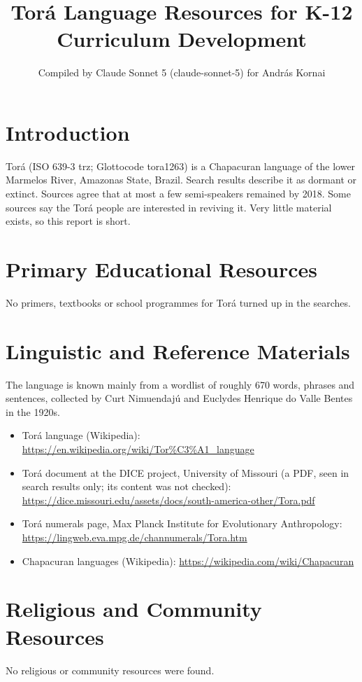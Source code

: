 \documentclass[12pt]{article}
\title{Tor\'a Language Resources for K-12 Curriculum Development}
\author{Compiled by Claude Sonnet 5 (claude-sonnet-5) for Andr\'as Kornai}
\date{}
\begin{document}
\maketitle

\section{Introduction}
Tor\'a (ISO 639-3 trz; Glottocode tora1263) is a Chapacuran language of the lower Marmelos River, Amazonas State, Brazil. Search results describe it as dormant or extinct. Sources agree that at most a few semi-speakers remained by 2018. Some sources say the Tor\'a people are interested in reviving it. Very little material exists, so this report is short.

\section{Primary Educational Resources}
No primers, textbooks or school programmes for Tor\'a turned up in the searches.

\section{Linguistic and Reference Materials}
The language is known mainly from a wordlist of roughly 670 words, phrases and sentences, collected by Curt Nimuend\-aj\'u and Euclydes Henrique do Valle Bentes in the 1920s.
\begin{itemize}
\item Tor\'a language (Wikipedia): \url{https://en.wikipedia.org/wiki/Tor%C3%A1_language}
\item Tor\'a document at the DICE project, University of Missouri (a PDF, seen in search results only; its content was not checked): \url{https://dice.missouri.edu/assets/docs/south-america-other/Tora.pdf}
\item Tor\'a numerals page, Max Planck Institute for Evolutionary Anthropology: \url{https://lingweb.eva.mpg.de/channumerals/Tora.htm}
\item Chapacuran languages (Wikipedia): \url{https://wikipedia.com/wiki/Chapacuran}
\end{itemize}

\section{Religious and Community Resources}
No religious or community resources were found.
\end{document}
